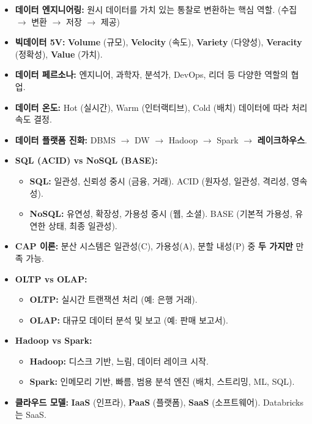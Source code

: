 \documentclass[11pt,a4paper]{article}
\theoremstyle{definition}
\begin{document}
\begin{itemize}
\begin{summarybox}
\begin{itemize}
    \item[] \textbf{데이터 엔지니어링:} 원시 데이터를 가치 있는 통찰로 변환하는 핵심 역할. (수집 $\rightarrow$ 변환 $\rightarrow$ 저장 $\rightarrow$ 제공)
    \item[] \textbf{빅데이터 5V:} \textbf{Volume} (규모), \textbf{Velocity} (속도), \textbf{Variety} (다양성), \textbf{Veracity} (정확성), \textbf{Value} (가치).
    \item[] \textbf{데이터 페르소나:} 엔지니어, 과학자, 분석가, DevOps, 리더 등 다양한 역할의 협업.
    \item[] \textbf{데이터 온도:} Hot (실시간), Warm (인터랙티브), Cold (배치) 데이터에 따라 처리 속도 결정.
    \item[] \textbf{데이터 플랫폼 진화:} DBMS $\rightarrow$ DW $\rightarrow$ Hadoop $\rightarrow$ Spark $\rightarrow$ \textbf{레이크하우스}.
    \item[] \textbf{SQL (ACID) vs NoSQL (BASE):}
    \begin{itemize}
        \item \textbf{SQL:} 일관성, 신뢰성 중시 (금융, 거래). ACID (원자성, 일관성, 격리성, 영속성).
        \item \textbf{NoSQL:} 유연성, 확장성, 가용성 중시 (웹, 소셜). BASE (기본적 가용성, 유연한 상태, 최종 일관성).
    \end{itemize}
    \item[] \textbf{CAP 이론:} 분산 시스템은 일관성(C), 가용성(A), 분할 내성(P) 중 \textbf{두 가지만} 만족 가능.
    \item[] \textbf{OLTP vs OLAP:}
    \begin{itemize}
        \item \textbf{OLTP:} 실시간 트랜잭션 처리 (예: 은행 거래).
        \item \textbf{OLAP:} 대규모 데이터 분석 및 보고 (예: 판매 보고서).
    \end{itemize}
    \item[] \textbf{Hadoop vs Spark:}
    \begin{itemize}
        \item \textbf{Hadoop:} 디스크 기반, 느림, 데이터 레이크 시작.
        \item \textbf{Spark:} 인메모리 기반, 빠름, 범용 분석 엔진 (배치, 스트리밍, ML, SQL).
    \end{itemize}
    \item[] \textbf{클라우드 모델:} \textbf{IaaS} (인프라), \textbf{PaaS} (플랫폼), \textbf{SaaS} (소프트웨어). Databricks는 SaaS.

\end{itemize}
\end{summarybox}
\end{itemize}
\end{document}
